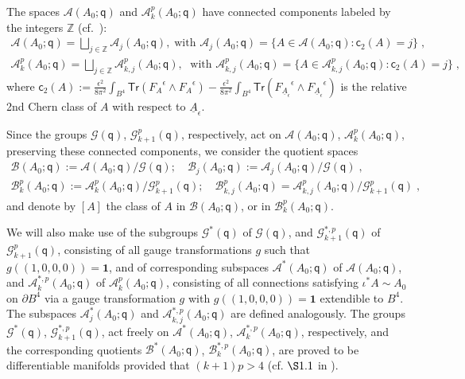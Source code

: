 \documentclass[11pt]{article}
\numberwithin{equation}{section} \setlength{\topmargin}{-35pt}
\newcommand{\Z}{\mathbb{Z}}
\newcommand{\q}{\mathsf{q}}
\newcommand{\tr}{\mathsf{Tr}}
\begin{document}
\noindent The spaces $\mathcal{A}(A_0;\q)$ and
$\mathcal{A}^p_k(A_0;\q)$ have connected components labeled by the
integers $\Z$ (cf.~\cite{IM}):
\begin{align*}
\mathcal{A}(A_0;\q)=\bigsqcup_{j\in\Z}\mathcal{A}_j(A_0;\q),\;\text{
with }
\mathcal{A}_j(A_0;\q)=\{A\in\mathcal{A}(A_0;\q):\mathsf{c}_2(A)=j\}\;,\\
\mathcal{A}^p_k(A_0;\q)=\bigsqcup_{j\in\Z}\mathcal{A}^p_{k,j}(A_0;\q),\;
\text{ with }
\mathcal{A}^p_{k,j}(A_0;\q)=\{A\in\mathcal{A}^p_{k,j}(A_0;\q):\mathsf{c}_2(A)=j\}\;,
\end{align*}
where
$\mathsf{c}_2(A):=\frac{\epsilon^2}{8\pi^2}\int_{B^4}\tr({F_A}^{\epsilon}\wedge
{F_A}^{\epsilon})-\frac{\epsilon^2}{8\pi^2}\int_{B^4}\tr({F_{\underline{A}_{\epsilon}}}^{\epsilon}\wedge
{F_{\underline{A}_{\epsilon}}}^{\epsilon})$ is the relative 2nd
Chern class of $A$ with respect to $\underline{A}_{\epsilon}$.

\noindent Since the groups $\mathcal{G}(\q)$,
$\mathcal{G}^p_{k+1}(\q)$, respectively,  act on
$\mathcal{A}(A_0;\q)$, $\mathcal{A}^p_k(A_0;\q)$, preserving these
connected components, we consider the quotient spaces
\begin{align*}
\mathcal{B}(A_0;\q):=\mathcal{A}(A_0;\q)/\mathcal{G}(\q);\quad
\mathcal{B}_{j}(A_0;\q):=\mathcal{A}_j(A_0;\q)/\mathcal{G}(\q)\;,\\
\mathcal{B}^p_k(A_0;\q):=\mathcal{A}^p_k(A_0;\q)/\mathcal{G}^p_{k+1}(\q);\quad
\mathcal{B}^p_{k,j}(A_0;\q)=\mathcal{A}^p_{k,j}(A_0;\q)/\mathcal{G}^p_{k+1}(\q)\;,
\end{align*}
and denote by $[A]$ the class of $A$ in $\mathcal{B}(A_0;\q)$, or in
$\mathcal{B}^p_k(A_0;\q)$.

\noindent We will also make use of the subgroups
$\mathcal{G}^{\ast}(\q)$ of $\mathcal{G}(\q)$, and
$\mathcal{G}^{\ast,p}_{k+1}(\q)$ of $\mathcal{G}^p_{k+1}(\q)$,
consisting of all gauge transformations $g$ such that
$g((1,0,0,0))=\mathbf{1}$, and of corresponding subspaces
$\mathcal{A}^{\ast}(A_0;\q)$ of $\mathcal{A}(A_0;\q)$, and
$\mathcal{A}^{\ast,p}_k(A_0;\q)$ of $\mathcal{A}^p_k(A_0;\q)$,
consisting of all connections satisfying $\iota^{\ast}A\sim A_0$ on
$\partial B^4$ via a gauge transformation $g$ with
$g((1,0,0,0))=\mathbf{1}$ extendible to $B^4$. The subspaces
$\mathcal{A}^{\ast}_j(A_0;\q)$ and
$\mathcal{A}^{\ast,p}_{k,j}(A_0;\q)$ are defined analogously. The
groups $\mathcal{G}^{\ast}(\q)$, $\mathcal{G}^{\ast,p}_{k+1}(\q)$,
act freely on $\mathcal{A}^{\ast}(A_0;\q)$,
$\mathcal{A}^{\ast,p}_k(A_0;\q)$, respectively, and the
corresponding quotients $\mathcal{B}^{\ast}(A_0;\q)$,
$\mathcal{B}^{\ast,p}_k(A_0;\q)$,  are proved to be differentiable
manifolds provided that $(k+1)p>4$ (cf. $\S1.1$ in \cite{IM3}).
\end{document}

